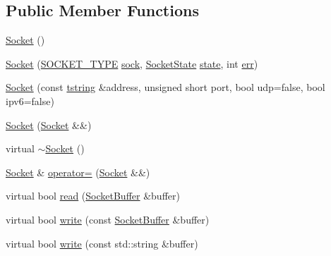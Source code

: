 \subsection*{Public Member Functions}
\begin{DoxyCompactItemize}
\item 
\hyperlink{classlog4cplus_1_1helpers_1_1Socket_a340868e9ebddda6854832e86a27018ca}{Socket} ()
\item 
\hyperlink{classlog4cplus_1_1helpers_1_1Socket_a26af2761d8a954ddd9ab0740597ed785}{Socket} (\hyperlink{namespacelog4cplus_1_1helpers_afe2a1567866b6a9e0bfd5d425c3323f2}{S\-O\-C\-K\-E\-T\-\_\-\-T\-Y\-P\-E} \hyperlink{classlog4cplus_1_1helpers_1_1AbstractSocket_af94ee3bfaba254e722bdd55429b61393}{sock}, \hyperlink{namespacelog4cplus_1_1helpers_ac57a089674b66ea982e43dff7ff1c78e}{Socket\-State} \hyperlink{classlog4cplus_1_1helpers_1_1AbstractSocket_a145f2db82d4ab080a5e114606b79b4c9}{state}, int \hyperlink{classlog4cplus_1_1helpers_1_1AbstractSocket_a26ff3fef10b1f1a6e50d41e78141bb4c}{err})
\item 
\hyperlink{classlog4cplus_1_1helpers_1_1Socket_a23779eebb31de260966a988d370e4db4}{Socket} (const \hyperlink{namespacelog4cplus_a3c9287f6ebcddc50355e29d71152117b}{tstring} \&address, unsigned short port, bool udp=false, bool ipv6=false)
\item 
\hyperlink{classlog4cplus_1_1helpers_1_1Socket_a840ddec885178619a1cf965901bfee3c}{Socket} (\hyperlink{classlog4cplus_1_1helpers_1_1Socket}{Socket} \&\&)
\item 
virtual \hyperlink{classlog4cplus_1_1helpers_1_1Socket_a85d2ae6cde2105616c08ae1137de338d}{$\sim$\-Socket} ()
\item 
\hyperlink{classlog4cplus_1_1helpers_1_1Socket}{Socket} \& \hyperlink{classlog4cplus_1_1helpers_1_1Socket_afafc344ce9633034e61aa11641cffb4e}{operator=} (\hyperlink{classlog4cplus_1_1helpers_1_1Socket}{Socket} \&\&)
\item 
virtual bool \hyperlink{classlog4cplus_1_1helpers_1_1Socket_a8f758d2bdcc354f70fa2ca955a5d9858}{read} (\hyperlink{classlog4cplus_1_1helpers_1_1SocketBuffer}{Socket\-Buffer} \&buffer)
\item 
virtual bool \hyperlink{classlog4cplus_1_1helpers_1_1Socket_a7bef445e62933ce96171f40185ef532c}{write} (const \hyperlink{classlog4cplus_1_1helpers_1_1SocketBuffer}{Socket\-Buffer} \&buffer)
\item 
virtual bool \hyperlink{classlog4cplus_1_1helpers_1_1Socket_a796161e1b8c3743bd287347986b78f30}{write} (const std\-::string \&buffer)
\end{DoxyCompactItemize}
